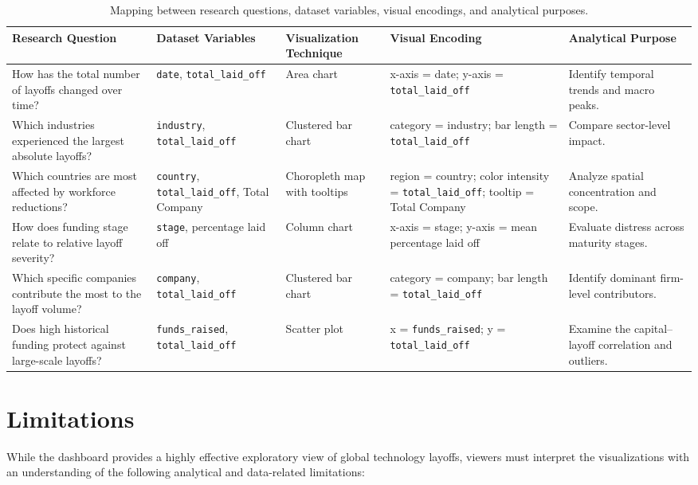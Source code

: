 \documentclass[a4paper,12pt]{article}
\begin{document}
\begin{table}[H]
\centering
\caption{Mapping between research questions, dataset variables, visual encodings, and analytical purposes.}
\label{tab:rq-mapping}
\tiny
\renewcommand{\arraystretch}{1.3}
\setlength{\tabcolsep}{2pt}
\begin{tabular}{L{0.22\textwidth} L{0.13\textwidth} L{0.14\textwidth} L{0.24\textwidth} L{0.13\textwidth}}
\toprule
\textbf{Research Question} & \textbf{Dataset Variables} & \textbf{Visualization Technique} & \textbf{Visual Encoding} & \textbf{Analytical Purpose} \\
\midrule
How has the total number of layoffs changed over time? & \texttt{date}, \texttt{total\_laid\_off} & Area chart & x-axis = date; y-axis = \texttt{total\_laid\_off} & Identify temporal trends and macro peaks. \\
Which industries experienced the largest absolute layoffs? & \texttt{industry}, \texttt{total\_laid\_off} & Clustered bar chart & category = industry; bar length = \texttt{total\_laid\_off} & Compare sector-level impact. \\
Which countries are most affected by workforce reductions? & \texttt{country}, \texttt{total\_laid\_off}, Total Company & Choropleth map with tooltips & region = country; color intensity = \texttt{total\_laid\_off}; tooltip = Total Company & Analyze spatial concentration and scope. \\
How does funding stage relate to relative layoff severity? & \texttt{stage}, percentage laid off & Column chart & x-axis = stage; y-axis = mean percentage laid off & Evaluate distress across maturity stages. \\
Which specific companies contribute the most to the layoff volume? & \texttt{company}, \texttt{total\_laid\_off} & Clustered bar chart & category = company; bar length = \texttt{total\_laid\_off} & Identify dominant firm-level contributors. \\
Does high historical funding protect against large-scale layoffs? & \texttt{funds\_raised}, \texttt{total\_laid\_off} & Scatter plot & x = \texttt{funds\_raised}; y = \texttt{total\_laid\_off} & Examine the capital--layoff correlation and outliers. \\
\bottomrule
\end{tabular}
\normalsize
\end{table}

\section{Limitations}
While the dashboard provides a highly effective exploratory view of global technology layoffs, viewers must interpret the visualizations with an understanding of the following analytical and data-related limitations:
\end{document}
